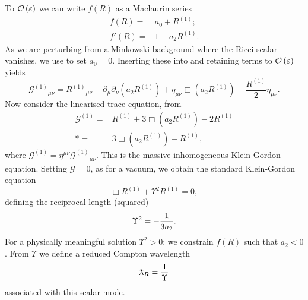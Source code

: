 To $\mathcal{O}\left({\varepsilon}\right)$ we can write $f(R)$ as a Maclaurin series
\begin{subequations}
\begin{align}
f(R) = {} & a_0 + R^{(1)}; \\
f'(R) = {} & 1 + a_2 R^{(1)}.
\end{align}
\end{subequations}
As we are perturbing from a Minkowski background where the Ricci scalar vanishes, we use  to set $a_0 = 0$. Inserting these into  and retaining terms to $\mathcal{O}\left({\varepsilon}\right)$ yields
\begin{equation}
{\mathcal{G}^{(1)}}_{\mu\nu} = {R^{(1)}}_{\mu\nu} - \partial_\mu\partial_\nu(a_2 R^{(1)}) + \eta_{\mu\nu}\Box(a_2 R^{(1)}) - \frac{R^{(1)}}{2}\eta_{\mu\nu}.
\label{eq:Field}
\end{equation}
Now consider the linearised trace equation, from 
\begin{align}
\mathcal{G}^{(1)} = {} & R^{(1)} + 3 \Box(a_2 R^{(1)}) - 2 R^{(1)} \nonumber \\*
 = {} & 3 \Box(a_2 R^{(1)}) - R^{(1)},
\label{eq:Box_R}
\end{align}
where $\mathcal{G}^{(1)} = \eta^{\mu\nu}{\mathcal{G}^{(1)}}_{\mu\nu}$. This is the massive inhomogeneous Klein-Gordon equation. Setting $\mathcal{G} = 0$, as for a vacuum, we obtain the standard Klein-Gordon equation
\begin{equation}
\Box R^{(1)} + \Upsilon^2 R^{(1)} = 0,
\end{equation}
defining the reciprocal length (squared)
\begin{equation}
\Upsilon^2 = -\frac{1}{3a_2}.
\end{equation}
For a physically meaningful solution $\Upsilon^2 > 0$: we constrain $f(R)$ such that $a_2 < 0$ \citep{Schmidt1986, Teyssandier1990, Olmo2005c, Corda2008}. From $\Upsilon$ we define a reduced Compton wavelength
\begin{equation}
\lambdabar_R = \recip{\Upsilon}
\end{equation}
associated with this scalar mode.

